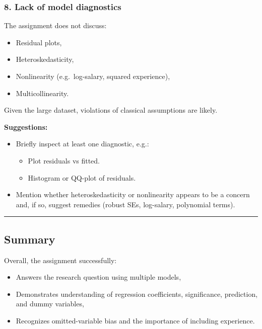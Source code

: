 \documentclass[
  letterpaper,
  DIV=11,
  numbers=noendperiod]{scrartcl}
\providecommand{\tightlist}{%
  \setlength{\itemsep}{0pt}\setlength{\parskip}{0pt}}
\begin{document}
\subsubsection{8. Lack of model
diagnostics}\label{lack-of-model-diagnostics}

The assignment does not discuss:

\begin{itemize}
\tightlist
\item
  Residual plots,
\item
  Heteroskedasticity,
\item
  Nonlinearity (e.g.~log-salary, squared experience),
\item
  Multicollinearity.
\end{itemize}

Given the large dataset, violations of classical assumptions are likely.

\textbf{Suggestions:}

\begin{itemize}
\tightlist
\item
  Briefly inspect at least one diagnostic, e.g.:

  \begin{itemize}
  \tightlist
  \item
    Plot residuals vs fitted.
  \item
    Histogram or QQ-plot of residuals.\\
  \end{itemize}
\item
  Mention whether heteroskedasticity or nonlinearity appears to be a
  concern and, if so, suggest remedies (robust SEs, log-salary,
  polynomial terms).
\end{itemize}

\begin{center}\rule{0.5\linewidth}{0.5pt}\end{center}

\subsection{Summary}\label{summary}

Overall, the assignment successfully:

\begin{itemize}
\tightlist
\item
  Answers the research question using multiple models,
\item
  Demonstrates understanding of regression coefficients, significance,
  prediction, and dummy variables,
\item
  Recognizes omitted-variable bias and the importance of including
  experience.
\end{itemize}
\end{document}

